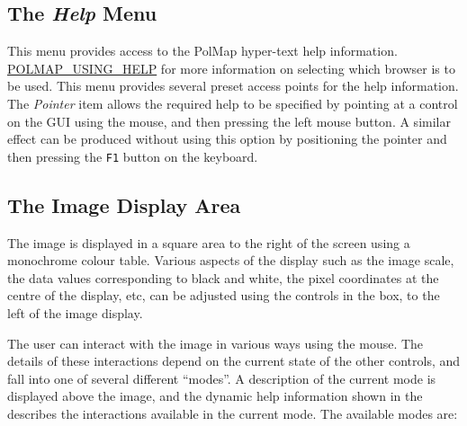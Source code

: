 \subsection {The {\em Help} Menu}
This menu provides access to the PolMap hyper-text help information. 
\hyperref{Go here}{See section }{}{POLMAP_USING_HELP} for more information
on selecting which browser is to be used. This menu provides several preset
access points for the help information. The {\em Pointer} item allows the 
required help to be specified by pointing at a control on the GUI using the 
mouse, and then pressing the left mouse button. A similar effect can be
produced without using this option by positioning the pointer and then
pressing the {\tt F1} button on the keyboard.

\subsection {The Image Display Area}
The image is displayed in a square area to the right of the
screen using a monochrome colour table. Various aspects of the display
such as the image scale, the data values corresponding to black and
white, the pixel coordinates at the centre of the display, etc, can be
adjusted using the controls in the  box, to the left of the image
display. 

The user can interact with the image in various ways using the mouse. The
details of these interactions depend on the current state of the other
controls, and fall into one of several different ``modes''. A description of 
the current mode is displayed above the image, and the dynamic help
information shown in the 
describes the interactions available in the current mode. The available
modes are:

